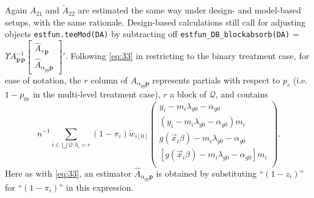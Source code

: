 \documentclass{article}
\newcommand{\owt}[1][{[z_{i}]}]{\ensuremath{\check{w}_{i#1}}}
\newcommand{\AbsorbInterceptsEF}{\Upsilon}
\begin{document}
Again $A_{21}$ and $\tilde{A}_{22}$ are estimated the same way under
design- and model-based setups, with the same rationale. Design-based calculations still call for adjusting objects \texttt{estfun.teeMod(DA)} by subtracting off
\texttt{estfun\_DB\_blockabsorb(DA)} = $\AbsorbInterceptsEF{}
  A_{\mathbf{p}\,\mathbf{p}}^{-1}\left[\begin{smallmatrix}\hat{A}_{\tau\,\mathbf{p}}\\
      \hat{A}_{\alpha_{yg}\mathbf{p}}\end{smallmatrix}\right]'$.
  Following \eqref{eq:33} in restricting to the binary treatment case,
  for ease of notation, the
  $r$ column of ${A}_{\alpha_{yg}\mathbf{p}}$ represents partials with
  respect to $p_{r}$ (i.e. $1-p_{0r}$ in the multi-level treatment case), $r$ a block of $\mathcal{Q}$, and contains
  \begin{equation*}
    n^{-1}\sum_{i\in \bigcup \mathcal{Q}: b_i=r}(1-\pi_{i})
    \owt[{[0]}]
  \begin{pmatrix}
    y_{i}-m_{i}\lambda_{y0} - \alpha_{y0}\\
    (y_{i}-m_{i}\lambda_{y0} - \alpha_{y0})m_i\\    
    g(\vec{x}_{i}\beta) - m_{i}\lambda_{g0}- \alpha_{g0}\\
    [g(\vec{x}_{i}\beta) - m_{i}\lambda_{g0}- \alpha_{g0}]m_{i}\\
  \end{pmatrix}.\end{equation*}
  Here as with \eqref{eq:33}, an estimator
  $\hat{A}_{\alpha_{yg}\mathbf{p}}$ is obtained by substituting
  ``$(1-z_{i})$'' for ``$(1-\pi_{i})$'' in this expression. 
\end{document}
